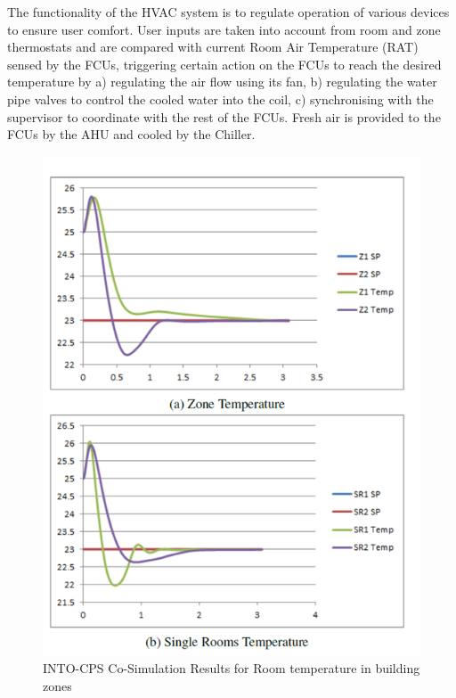 The functionality of the HVAC system is to regulate operation of various devices to ensure user comfort. User inputs are taken into account from room and zone thermostats and are compared with current Room Air Temperature (RAT) sensed by the FCUs, triggering certain action on the FCUs to reach the desired temperature by a) regulating the air flow using its fan, b) regulating the water pipe valves to control the cooled water into the coil, c) synchronising with the supervisor to coordinate with the rest of the FCUs. Fresh air is provided to the FCUs by the AHU and cooled by the Chiller.

\begin{figure}[!ht]
	\centering
		\includegraphics[width=0.9 \textwidth]{./figures/building}
	\caption{INTO-CPS Co-Simulation Results for Room temperature in building zones}
	\label{fig:building}
\end{figure}

